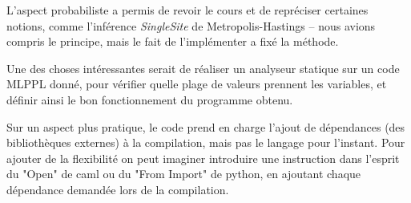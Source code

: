 \documentclass[svgnames]{article}
\begin{document}
L'aspect probabiliste a permis de revoir le cours et de repréciser certaines notions, comme l'inférence \emph{SingleSite} de Metropolis-Hastings -- nous avions compris le principe, mais le fait de l'implémenter a fixé la méthode.

Une des choses intéressantes serait de réaliser un analyseur statique sur un code MLPPL donné, pour vérifier quelle plage de valeurs prennent les variables, et définir ainsi le bon fonctionnement du programme obtenu.

Sur un aspect plus pratique, le code prend en charge l'ajout de dépendances (des bibliothèques externes) à la compilation, mais pas le langage pour l'instant. Pour ajouter de la flexibilité on peut imaginer introduire une instruction dans l'esprit du "Open" de caml ou du "From Import" de python, en ajoutant chaque dépendance demandée lors de la compilation.
\end{document}
